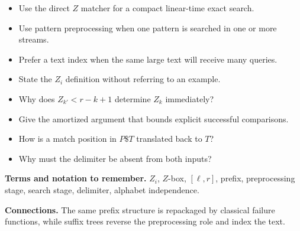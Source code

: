 \documentclass[11pt]{article}
\begin{document}
\begin{tcolorbox}[enhanced,breakable,title={Algorithm selection / when to use this},
  colback=Primary!3,colframe=Primary,fonttitle=\small\sffamily\bfseries,fontupper=\footnotesize,
  boxsep=0.6mm,left=1.5mm,right=1.5mm,top=1mm,bottom=1mm,before skip=3pt,after skip=3pt]
\begin{itemize}
  \item Use the direct $Z$ matcher for a compact linear-time exact search.
  \item Use pattern preprocessing when one pattern is searched in one or more streams.
  \item Prefer a text index when the same large text will receive many queries.
\end{itemize}
\end{tcolorbox}

\begin{tcolorbox}[enhanced,breakable,title={Self-test questions},
  colback=white,colframe=Accent,fonttitle=\small\sffamily\bfseries,fontupper=\footnotesize,
  boxsep=0.6mm,left=1.5mm,right=1.5mm,top=1mm,bottom=1mm,before skip=3pt,after skip=3pt]
\begin{itemize}
  \item State the $Z_i$ definition without referring to an example.
  \item Why does $Z_{k'}<r-k+1$ determine $Z_k$ immediately?
  \item Give the amortized argument that bounds explicit successful comparisons.
  \item How is a match position in $P\$T$ translated back to $T$?
  \item Why must the delimiter be absent from both inputs?
\end{itemize}
\end{tcolorbox}

{\footnotesize
\textbf{Terms and notation to remember.} $Z_i$, $Z$-box, $[\ell,r]$, prefix, preprocessing stage, search stage, delimiter, alphabet independence.

\textbf{Connections.} The same prefix structure is repackaged by classical failure functions, while suffix trees reverse the preprocessing role and index the text.
}
\end{document}
